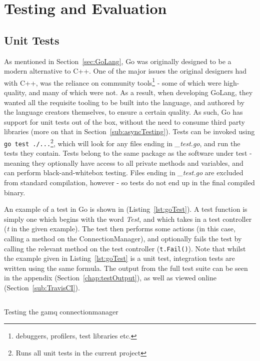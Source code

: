 \chapter{Testing and Evaluation}
\label{chap:Testing and Evaluation}

\section{Unit Tests}
\label{sec:Unit Tests}

As mentioned in Section~\ref{sec:GoLang}, Go was originally designed to be a
modern alternative to C++. One of the major issues the original designers had
with C++, was the reliance on community tools\footnote{debuggers, profilers,
test libraries etc.} - some of which were high-quality, and many of which were
not. As a result, when developing GoLang, they wanted all the requisite tooling
to be built into the language, and authored by the language creators themselves,
to ensure a certain quality. As such, Go has support for unit tests out of the
box, without the need to consume third party libraries (more on that in
Section~\ref{sub:asyncTesting}). Tests can be invoked using \texttt{go
test ./...}\footnote{Runs all unit tests in the current project}, which will
look for any files ending in \emph{\_test.go}, and run the tests they contain.
Tests belong to the same package as the software under test - meaning they
optionally have access to all private methods and variables, and can perform
black-and-whitebox testing. Files ending in \emph{\_test.go} are excluded from
standard compilation, however - so tests do not end up in the final compiled
binary.

An example of a test in Go is shown in (Listing~\ref{lst:goTest}). A test
function is simply one which begins with the word \emph{Test}, and which takes
in a test controller (\emph{t} in the given example). The test then performs
some actions (in this case, calling a method on the ConnectionManager), and
optionally fails the test by calling the relevant method on the test controller
(\texttt{t.Fail()}). Note that whilst the example given in
Listing~\ref{lst:goTest} is a unit test, integration tests are written using the
same formula. The output from the full test suite can be seen in the appendix
(Section~\ref{chap:testOutput}), as well as viewed online
(Section~\ref{sub:TravisCI}).

\begin{listing}[htbp]
  \centering
  \inputminted[firstline=13,lastline=27]{go}{code/gamq/connectionmanager_test.go}
  \caption{Testing the gamq connectionmanager}
  \label{lst:goTest}
\end{listing}

